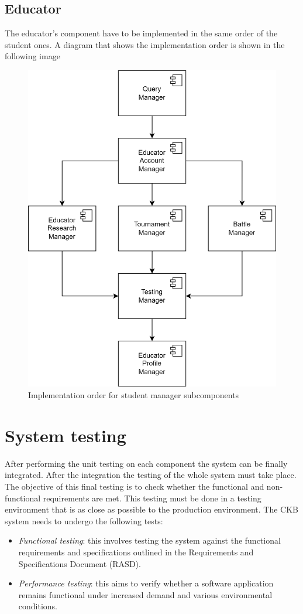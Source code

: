 \documentclass[12pt, a4paper]{report}
\begin{document}
    \subsection{Educator}
    The educator's component have to be implemented in the same order of the student ones. 
    A diagram that shows the implementation order is shown in the following image
    \begin{figure}[H]
        \centering
        \includegraphics[width=0.5\linewidth]{images/educator_impl.png}
        \caption{Implementation order for student manager subcomponents}
    \end{figure}

    \section{System testing}
    After performing the unit testing on each component the system can be finally integrated. 
    After the integration the testing of the whole system must take place. 
    The objective of this final testing is to check whether the functional and non-functional requirements are met. 
    This testing must be done in a testing environment that is as close as possible to the production environment.
    The CKB system needs to undergo the following tests: 
    \begin{itemize}
        \item \textit{Functional testing}: this involves testing the system against the functional requirements and specifications outlined in the Requirements and Specifications Document (RASD).
        \item \textit{Performance testing}: this aims to verify whether a software application remains functional under increased demand and various environmental conditions.
    \end{itemize}
\end{document}
